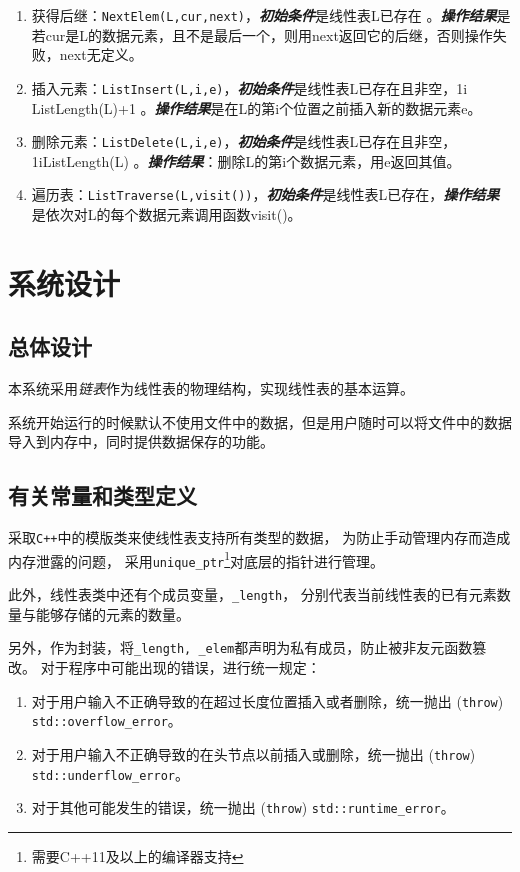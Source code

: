 \begin{enumerate}
\item 获得后继：\texttt{NextElem(L,cur,next)}，\newline \textbf{\emph{初始条件}}是线性表L已存在 。\newline \textbf{\emph{操作结果}}是若cur是L的数据元素，且不是最后一个，则用next返回它的后继，否则操作失败，next无定义。
\item 插入元素：\texttt{ListInsert(L,i,e)}，\newline \textbf{\emph{初始条件}}是线性表L已存在且非空，1\le i \le ListLength(L)+1 。\newline \textbf{\emph{操作结果}}是在L的第i个位置之前插入新的数据元素e。
\item 删除元素：\texttt{ListDelete(L,i,e)}，\newline \textbf{\emph{初始条件}}是线性表L已存在且非空，1\le i\le ListLength(L) 。\newline \textbf{\emph{操作结果}}：删除L的第i个数据元素，用e返回其值。
\item 遍历表：\texttt{ListTraverse(L,visit())}，\newline \textbf{\emph{初始条件}}是线性表L已存在，\newline \textbf{\emph{操作结果}}是依次对L的每个数据元素调用函数visit()。
\end{enumerate}
\section{系统设计}
\subsection{总体设计}
本系统采用\emph{链表}作为线性表的物理结构，实现线性表的基本运算。
\par
系统开始运行的时候默认不使用文件中的数据，但是用户随时可以将文件中的数据导入到内存中，同时提供数据保存的功能。
\subsection{有关常量和类型定义}
采取\texttt{C++}中的模版类来使线性表支持所有类型的数据，
为防止手动管理内存而造成内存泄露的问题，
采用\texttt{unique\_ptr}\footnote{需要C++11及以上的编译器支持}对底层的指针进行管理。
\par
此外，线性表类中还有个成员变量，\texttt{\_length}，
分别代表当前线性表的已有元素数量与能够存储的元素的数量。
\par
另外，作为封装，将\texttt{\_length, \_elem}都声明为私有成员，防止被非友元函数篡改。
对于程序中可能出现的错误，进行统一规定：
\begin{enumerate}
    \item 对于用户输入不正确导致的在超过长度位置插入或者删除，统一抛出 (\texttt{throw}) \texttt{std::overflow\_error}。
    \item 对于用户输入不正确导致的在头节点以前插入或删除，统一抛出 (\texttt{throw}) \texttt{std::underflow\_error}。
    \item 对于其他可能发生的错误，统一抛出 (\texttt{throw}) \texttt{std::runtime\_error}。
\end{enumerate}
